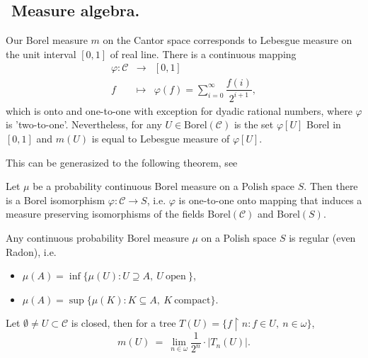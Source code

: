 \subsection{${}$ \hspace{-1em}Measure algebra.}
Our Borel measure $m$ on the Cantor space corresponds to Lebesgue measure
on the unit interval $[0,1]$ of real line. There is a continuous mapping
\begin{eqnarray*}
 \varphi : \mathcal C & \longrightarrow & [0,1] \\
		f & \longmapsto & \varphi(f) = \sum_{i=0}^\infty \dfrac{f(i)}{2^{i+1}},
\end{eqnarray*}
which is onto and one-to-one with exception for dyadic rational numbers,
where $\varphi$ is 'two-to-one'. Nevertheless, for any $U \in \mbox{Borel}(\mathcal C)$
is the set $\varphi[U]$ Borel in $[0,1]$ and $m(U)$ is equal to Lebesgue
measure of $\varphi[U]$.

\medskip

This can be generasized to the following theorem, see \cite{Ke:1994}

\begin{theorem}
 Let $\mu$ be a probability continuous Borel measure on a Polish space $S$. Then
there is  a Borel isomorphism $\varphi : \mathcal C \to S$, i.e. $\varphi$ is
one-to-one onto mapping that induces a measure preserving isomorphisms of
the fields Borel$(\mathcal C)$ and Borel$(S)$.
\end{theorem}

\begin{theorem}
 Any continuous probability Borel measure $\mu$ on a Polish space $S$ is regular
(even Radon), i.e.
\begin{itemize}
 \item[{}] $\mu(A)  = \inf \{\mu(U) : U \supseteq A,\ U \ \mbox{open} \ \}$,
 \item[{}] $\mu(A)  = \sup \{\mu(K) : K \subseteq A, \ K \ \mbox{compact} \}$.
\end{itemize}
\end{theorem}



\begin{fact}
 Let $\emptyset \not = U \subset \mathcal C$ is closed, then for a tree
 $T(U) = \{ f \upharpoonright n : f \in U, \ n \in \omega \}$,
$$
m(U) \ = \ \lim_{n \in \omega} \dfrac{1}{2^n} \cdot |T_n(U)|.
$$
\end{fact}


